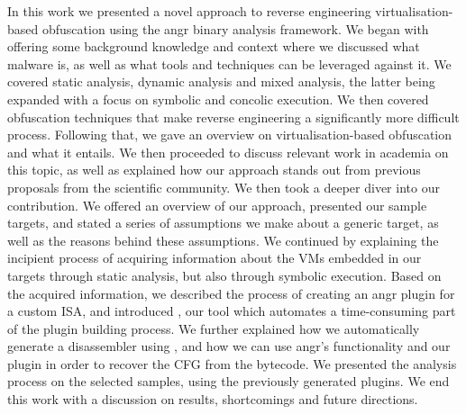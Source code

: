 In this work we presented a novel approach to reverse engineering virtualisation-based obfuscation using the angr binary analysis framework. We began with offering some background knowledge and context where we discussed what malware is, as well as what tools and techniques can be leveraged against it. We covered static analysis, dynamic analysis and mixed analysis, the latter being expanded with a focus on symbolic and concolic execution. We then covered obfuscation techniques that make reverse engineering a significantly more difficult process. Following that, we gave an overview on virtualisation-based obfuscation and what it entails. We then proceeded to discuss relevant work in academia on this topic, as well as explained how our approach stands out from previous proposals from the scientific community. We then took a deeper diver into our contribution. We offered an overview of our approach, presented our sample targets, and stated a series of assumptions we make about a generic target, as well as the reasons behind these assumptions. We continued by explaining the incipient process of acquiring information about the \glspl{VM} embedded in our targets through static analysis, but also through symbolic execution. Based on the acquired information, we described the process of creating an angr plugin for a custom \gls{ISA}, and introduced , our tool which automates a time-consuming part of the plugin building process. We further explained how we automatically generate a disassembler using , and how we can use angr's functionality and our plugin in order to recover the \gls{CFG} from the bytecode. We presented the analysis process on the selected samples, using the previously generated plugins. We end this work with a discussion on results, shortcomings and future directions.

